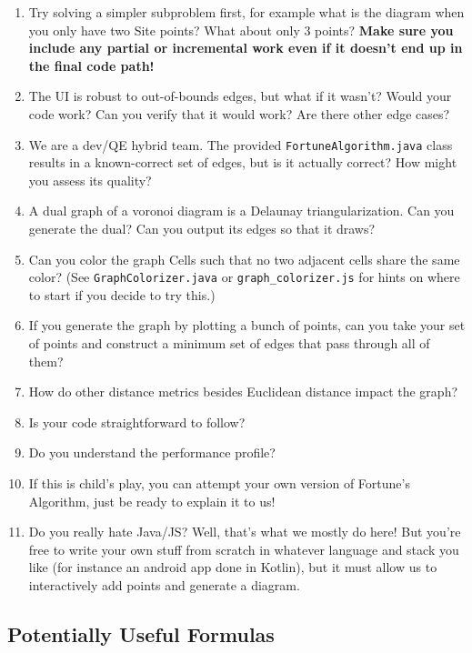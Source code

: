 \documentclass[12pt]{article}
\begin{document}
\begin{enumerate}
  \item Try solving a simpler subproblem first, for example what is the diagram
    when you only have two Site points? What about only 3 points? \textbf{Make
    sure you include any partial or incremental work even if it doesn't end up in the final code
    path!}
  \item The UI is robust to out-of-bounds edges, but what if it wasn't? Would
    your code work? Can you verify that it would work? Are there other edge
    cases?
  \item We are a dev/QE hybrid team. The provided \texttt{FortuneAlgorithm.java}
    class results in a known-correct set of edges, but is it actually correct?
    How might you assess its quality?
  \item A dual graph of a voronoi diagram is a Delaunay triangularization. Can
    you generate the dual? Can you output its edges so that it draws?
  \item Can you color the graph Cells such that no two adjacent cells share the
    same color? (See \texttt{GraphColorizer.java} or
    \texttt{graph\_colorizer.js} for hints on where to start if you decide to
    try this.)
  \item If you generate the graph by plotting a bunch of points, can you take
    your set of points and construct a minimum set of edges that pass through
    all of them?
  \item How do other distance metrics besides Euclidean distance impact the
    graph?
  \item Is your code straightforward to follow?
  \item Do you understand the performance profile?
  \item If this is child's play, you can attempt your own version of Fortune's
    Algorithm, just be ready to explain it to us!
  \item Do you really hate Java/JS? Well, that's what we mostly do here! But
    you're free to write your own stuff from scratch in whatever language and
    stack you like (for instance an android app done in Kotlin), but it must
    allow us to interactively add points and generate a diagram.

\end{enumerate}

\subsection*{Potentially Useful Formulas}
\end{document}
